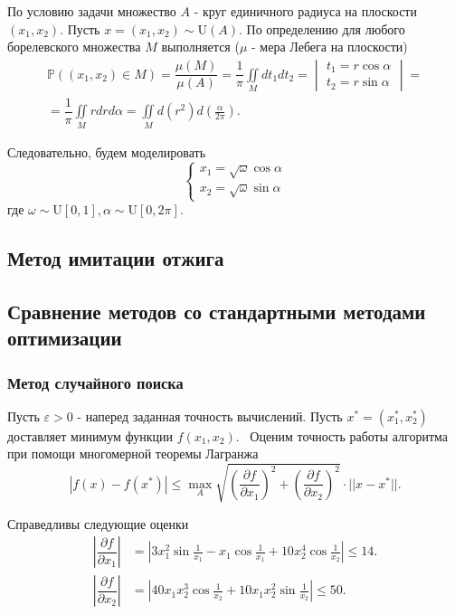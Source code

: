 \documentclass[11pt]{report}
\begin{document}
По условию задачи множество $A$ - круг единичного радиуса на плоскости $(x_1,x_2)$. Пусть $x=(x_1,x_2)\sim\mathrm{U}(A)$. По определению для любого борелевского множества $M$ выполняется ($\mu$ - мера Лебега на плоскости)
\begin{multline*}
\mathbb{P}\left( (x_1,x_2)\in M \right) = \dfrac{\mu (M)}{\mu (A)} = \dfrac{1}{\pi}\iint\limits_M dt_1dt_2 = \begin{vmatrix}
t_1 = r\cos\alpha \\
t_2 = r\sin\alpha
\end{vmatrix} =\\
= \dfrac{1}{\pi}\iint\limits_M rdrd\alpha = \iint\limits_M d(r^2)d\left(\frac{\alpha}{2\pi}\right).
\end{multline*}

Следовательно, будем моделировать
$$
\begin{cases}
x_1 = \sqrt{\omega}\cos\alpha \\
x_2 = \sqrt{\omega}\sin\alpha
\end{cases}
$$
где $\omega\sim\mathrm{U}[0,1], \alpha\sim\mathrm{U}[0,2\pi]$.



\subsection{Метод имитации отжига}

\subsection{Сравнение методов со стандартными методами оптимизации}

\subsubsection{Метод случайного поиска}

Пусть $\varepsilon>0$ - наперед заданная точность вычислений. Пусть $x^*=(x_1^*,x_2^*)$ доставляет минимум функции $f(x_1,x_2)$. \
Оценим точность работы алгоритма при помощи многомерной теоремы Лагранжа
$$
|f(x) - f(x^*)| \leqslant \max\limits_A 
\sqrt{\left(\dfrac{\partial f}{\partial x_1}\right)^2 + \left(\dfrac{\partial f}{\partial x_2}\right)^2} \cdot || x - x^* ||.
$$

Справедливы следующие оценки
$$
\begin{aligned}
\left|\dfrac{\partial f}{\partial x_1}\right| &= \left| 3x_1^2\sin\frac{1}{x_1} - x_1\cos\frac{1}{x_1} + 10x_2^4\cos\frac{1}{x_2}  \right| \leqslant 14. \\
\left|\dfrac{\partial f}{\partial x_2}\right| &= \left| 40x_1x_2^3\cos\frac{1}{x_2} + 10x_1x_2^2\sin\frac{1}{x_2} \right| \leqslant 50.
\end{aligned}
$$
\end{document}
